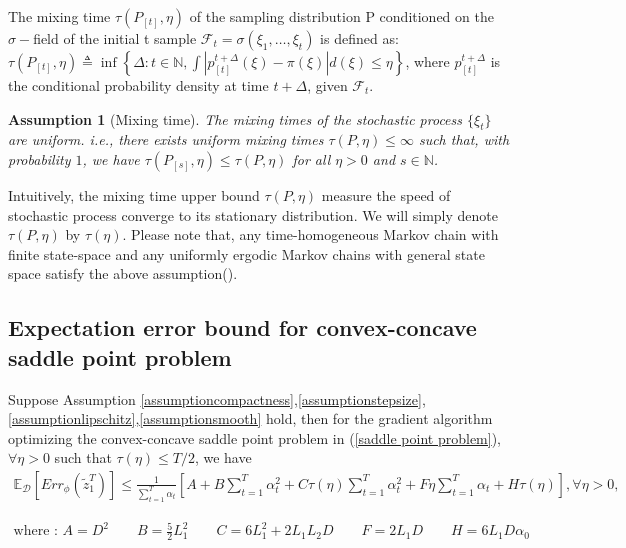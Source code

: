\documentclass[twoside,11pt]{article}
\newtheorem{assumption}{Assumption}
\numberwithin{equation}{section}
\newcommand{\E}{\mathbb{E}}
\newcommand{\huaf}{\mathcal{F}}
\begin{document}
	
	
	\begin{definition}\label{def mixing time}
		The mixing time $ \tau(P_{[t]},\eta)$ of the sampling distribution P conditioned on the $ \sigma-$field of the initial t sample $ \huaf_t = \sigma(\xi_1,\dots,\xi_t) $ is defined as: $ \tau(P_{[t]},\eta)\triangleq \inf\left\lbrace \Delta  : t\in \mathbb{N}, \int |p_{[t]}^{t+\Delta}(\xi) - \pi(\xi)|d(\xi) \le \eta\right\rbrace $, where $ p_{[t]}^{t+\Delta} $ is the conditional probability density at time $t + \Delta $, given $\mathcal{F}_t$. 	
	\end{definition}
	
	
	\begin{assumption}[Mixing time]\label{assume mixing time}
		The mixing times of the stochastic process $ \lbrace\xi_t \rbrace$  are uniform. i.e., there exists uniform mixing times $\tau(P,\eta) \le \infty$ such that, with probability $1$, we have $ \tau(P_{[s]},\eta)\le \tau(P, \eta) $ for all $ \eta >0 $ and $ s \in \mathbb{N} $. 
	\end{assumption}
	
	
	Intuitively, the mixing time upper bound $ \tau( P, \eta) $ measure the speed of stochastic process converge to its stationary distribution. We will simply denote $ \tau(P, \eta) $ by $ \tau(\eta) $. Please note that, any time-homogeneous Markov chain with finite state-space and any uniformly ergodic Markov chains with general state space satisfy the above assumption(\cite{meyn2012markov}). 
	
	
	
	
	\subsection{Expectation error bound for convex-concave saddle point problem}
	
	\begin{theorem}\label{expectationbound}
		
		Suppose Assumption \ref{assumptioncompactness},\ref{assumptionstepsize},\ref{assumptionlipschitz},\ref{assumptionsmooth} hold, then for the gradient algorithm optimizing the convex-concave saddle point problem in (\ref{saddle point problem}),  $\forall \eta > 0 $ such that $ \tau(\eta)\le T/2$, we have 
		 \begin{align*}
		\E_{\mathcal D} [Err_\phi(\tilde{z}_1^T)] 
		\le 		\frac{1}{\sum_{t=1}^{T}\alpha_t} \left[ A  +B \sum_{t=1}^{T}\alpha_t^2 + C\tau(\eta)\sum_{t=1}^{T}\alpha_t^2  + F\eta\sum_{t=1}^{T}\alpha_t + H\tau(\eta) \right], \forall \eta>0,
		\end{align*} 
		
		\begin{small}
			\begin{align*}
			\text{where : }
			A = D^2   \qquad
			B = \frac{5}{2} L_1^2 \qquad
			C = 6L_1^2 + 2L_1L_2D \qquad
			F = 2L_1D  \qquad
			H = 6L_1D\alpha_0  
			\end{align*} 
			
		\end{small}
		
		
	\end{theorem}
	
\end{document}
